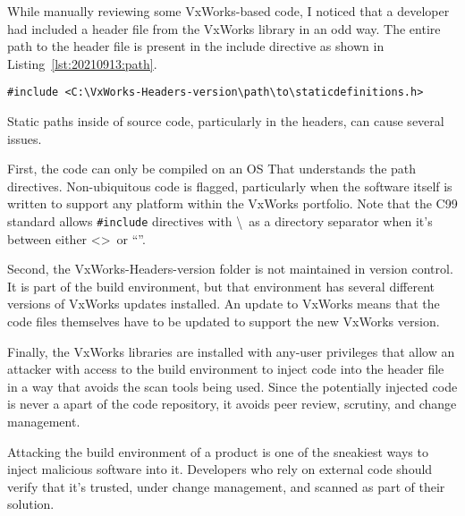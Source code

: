 While manually reviewing some VxWorks-based code, I noticed that a developer had included a header file from the VxWorks library in an odd way. The entire path to the header file is present in the include directive as shown in Listing~\ref{lst:20210913:path}.

\begin{lstlisting}[caption={Include Directive},captionpos=b,style=CStyle,basicstyle=\scriptsize,label={lst:20210913:path}]
#include <C:\VxWorks-Headers-version\path\to\staticdefinitions.h>
\end{lstlisting}

Static paths inside of source code, particularly in the headers, can cause several issues.

First, the code can only be compiled on an OS That understands the path directives. Non-ubiquitous code is flagged, particularly when the software itself is written to support any platform within the VxWorks portfolio.\autocite{20210913:cwe-589} Note that the C99 standard allows \texttt{\#include} directives with \textbackslash\ as a directory separator when it's between either \textless \textgreater\ or ``''.

Second, the VxWorks-Headers-version folder is not maintained in version control. It is part of the build environment, but that environment has several different versions of VxWorks updates installed. An update to VxWorks means that the code files themselves have to be updated to support the new VxWorks version.

Finally, the VxWorks libraries are installed with any-user privileges that allow an attacker with access to the build environment to inject code into the header file in a way that avoids the scan tools being used. Since the potentially injected code is never a apart of the code repository, it avoids peer review, scrutiny, and change management.

Attacking the build environment of a product is one of the sneakiest ways to inject malicious software into it. Developers who rely on external code should verify that it's trusted, under change management, and scanned as part of their solution.
